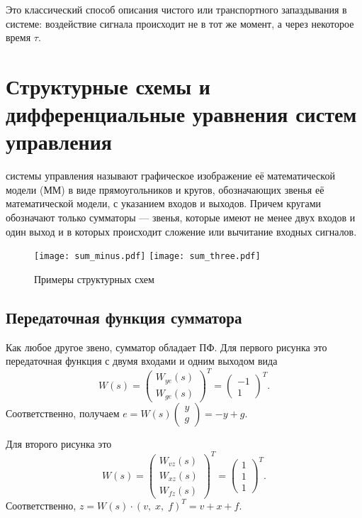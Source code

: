 \documentclass[../../TAU.tex]{subfiles}
\begin{document}
    Это классический способ описания чистого или транспортного запаздывания в системе: воздействие сигнала происходит не в тот же момент, а через некоторое время $\tau$.

\section{Структурные схемы и дифференциальные уравнения систем управления}

     системы управления называют графическое изображение её математической модели (ММ) в виде прямоугольников и кругов, обозначающих звенья её математической модели, с указанием входов и выходов. Причем кругами обозначают только сумматоры --- звенья, которые имеют не менее двух входов и один выход и в которых происходит сложение или вычитание входных сигналов.

    \begin{figure}[h]
        \centering
        \texttt{[image: sum\_minus.pdf]}
        \texttt{[image: sum\_three.pdf]}
        \caption{Примеры структурных схем}
        \centering
    \end{figure}

\subsection{Передаточная функция сумматора}

    Как любое другое звено, сумматор обладает ПФ. Для первого рисунка это передаточная функция с двумя входами и одним выходом вида
    $$
        W(s) =
        \begin{pmatrix}
            W_{ye}(s)\\
            W_{ge}(s)
        \end{pmatrix}^T =
        \begin{pmatrix}
            -1\\
            1
        \end{pmatrix}^T.
    $$
    Соответственно, получаем 
    $e = W(s)\begin{pmatrix}y\\g\end{pmatrix} = -y+g$.

    Для второго рисунка это
    $$
        W(s) =
        \begin{pmatrix}
            W_{vz}(s)\\
            W_{xz}(s)\\
            W_{fz}(s)
        \end{pmatrix}^T =
        \begin{pmatrix}
            1\\
            1\\
            1
        \end{pmatrix}^T.
    $$
    Соответственно, 
    $z = W(s) \cdot (v,\; x,\; f)^T= v+x+f$.
\end{document}
